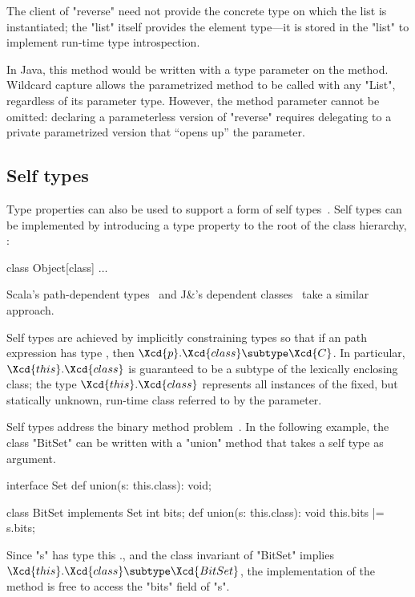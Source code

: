 The client of \xcd"reverse" need not provide the concrete type
on which the list is instantiated; the \xcd"list" itself
provides the element type---it is stored in the \xcd"list"
to implement run-time type introspection.

In Java, this method would be written with a type parameter on
the method.
Wildcard
capture allows the parametrized method to be called with any \xcd"List",
regardless of its parameter type.
However,
the method parameter cannot be omitted: declaring a parameterless version
of \xcd"reverse" requires delegating to a private parametrized version that
``opens up'' the parameter.


\subsection{Self types}

Type properties can also be used to support a form of self
types~\cite{bruce-binary,bsg95}.
%
Self types can be implemented by introducing a
type property  to the root of the class hierarchy, :
{\footnotesize
\begin{xtenmath}
class Object[class] { $\dots$ }
\end{xtenmath}}

\noindent
Scala's path-dependent types~\cite{scala} and J\&'s
dependent classes~\cite{nqm06}
take a similar approach.

Self types are achieved by
implicitly constraining types so that if an path expression 
has type , then
$\Xcd{p}.\Xcd{class} \subtype \Xcd{C}$.  In particular,
$\Xcd{this}.\Xcd{class}$ is guaranteed to be a subtype
of the lexically enclosing class; the type
$\Xcd{this}.\Xcd{class}$ represents all instances of the fixed,
but statically unknown, run-time class referred to by the 
parameter.

Self types address the binary method problem~\cite{bruce-binary}.
In the following
example, the class \xcd"BitSet" can be written with a
\xcd"union" method that takes a self type as argument.

{\footnotesize
\begin{xtenmath}
interface Set {
  def union(s: this.class): void;
}

class BitSet implements Set {
  int bits;
  def union(s: this.class): void {
    this.bits |= s.bits;
  }
}
\end{xtenmath}}

\noindent
Since \xcd"s" has type this ., and the class
invariant of \xcd"BitSet" implies
$\Xcd{this}.\Xcd{class} \subtype \Xcd{BitSet}$,
the implementation of the method is free to access the
\xcd"bits" field of \xcd"s".

